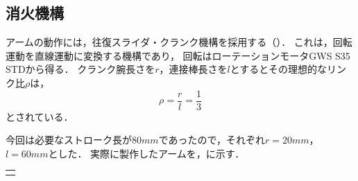 \documentclass[11pt,a4]{jsarticle}
\begin{document}

  \subsection{消火機構}  %

    アームの動作には，往復スライダ・クランク機構を採用する（）．
    これは，回転運動を直線運動に変換する機構であり，
    回転はローテーションモータGWS S35 STDから得る．
    クランク腕長さを$r$，連接棒長さを$l$とするとその理想的なリンク比$\rho$は，
    \begin{equation}
      \rho = \frac{r}{l}=\frac{1}{3}
    \end{equation}
    とされている．

    今回は必要なストローク長が$80\unit{mm}$であったので，それぞれ$r=20\unit{mm}$，$l=60\unit{mm}$とした．
    実際に製作したアームを，に示す．


    \begin{tabular}{c}
      \begin{minipage}{0.45\hsize}
        {H}{1.0}{picture/arm_left.eps}{アーム左面}
      \end{minipage}
      \begin{minipage}{0.45\hsize}
        {H}{1.0}{picture/arm_right.eps}{アーム左面}
      \end{minipage}
    \end{tabular}

\end{document}
